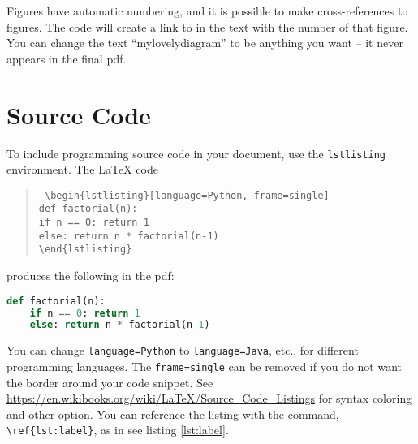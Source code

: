 Figures have automatic numbering, and it is possible to make cross-references 
to figures. The code  will create a link to 
 in the text with the number of that figure. You can 
change the text ``mylovelydiagram'' to be anything you want -- it never appears 
in the final pdf.

\section{Source Code}

To include programming source code in your document, use the 
\texttt{lstlisting} environment. The \LaTeX{} code
\begin{quote}\tt
	\textbackslash{}begin\{lstlisting\}[language=Python, frame=single] 
	\\[-0.5em]
    \hspace*{2em}def factorial(n): \\[-0.5em]
    \hspace*{4em}if n == 0: return 1 \\[-0.5em]
    \hspace*{4em}else: return n * factorial(n-1) \\[-0.5em]
    \textbackslash{}end\{lstlisting\}
\end{quote}
produces the following in the pdf: \\
\begin{lstlisting}[language=Python, frame=single, label={lst:label}, 
caption={Some Python code}]
def factorial(n):
	if n == 0: return 1
	else: return n * factorial(n-1)
\end{lstlisting}
You can change \texttt{language=Python} to \texttt{language=Java}, etc., for 
different programming languages. The \texttt{frame=single} can be removed if 
you do not want the border around your code snippet. See 
\url{https://en.wikibooks.org/wiki/LaTeX/Source_Code_Listings} for syntax 
coloring and other option. You can reference the listing with the command, 
\texttt{\textbackslash{}ref\{lst:label\}}, as in see listing \ref{lst:label}.
